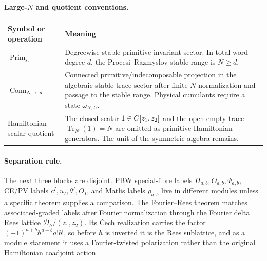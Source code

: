 \paragraph{Large-\(N\) and quotient conventions.}
\begin{center}
\begin{tabular}{@{}>{\raggedright\arraybackslash}p{}
  >{\raggedright\arraybackslash}p{}@{}}
\hline
\textbf{Symbol or operation} & \textbf{Meaning}\\
\hline
\(\operatorname{Prim}_{\mathrm{st}}\) &
Degreewise stable primitive invariant sector. In total word degree
\(d\), the Procesi--Razmyslov stable range is \(N\geq d\).\\
\hline
\(\operatorname{Conn}_{N\to\infty}\) &
Connected primitive/indecomposable projection in the algebraic stable
trace sector after finite-\(N\) normalization and passage to the stable
range. Physical cumulants require a state \(\omega_{N,\Omega}\).\\
\hline
Hamiltonian scalar quotient &
The closed scalar \(1\in C[z_1,z_2]\) and the open empty trace
\(\operatorname{Tr}_N(1)=N\) are omitted as primitive Hamiltonian
generators. The unit of the symmetric algebra remains.\\
\hline
\end{tabular}
\end{center}

\paragraph{Separation rule.}
The next three blocks are disjoint.  PBW special-fibre labels
\(H_{a,b},O_{a,b},\Psi_{a,b}\), CE/PV labels \(c^I,u_I,\theta^I,O_I\),
and Matlis labels \(\rho_{a,b}\) live in different modules unless a
specific theorem supplies a comparison.  The Fourier--Rees theorem
matches associated-graded labels after Fourier normalization through
the Fourier delta Rees lattice
\(\mathcal D_\hbar/(z_1,z_2)\).  Its \v{C}ech realization carries the
factor \((-1)^{a+b}\hbar^{a+b}a!b!\), so before \(\hbar\) is inverted
it is the Rees sublattice, and as a module statement it uses a
Fourier-twisted polarization rather than the original Hamiltonian
coadjoint action.

